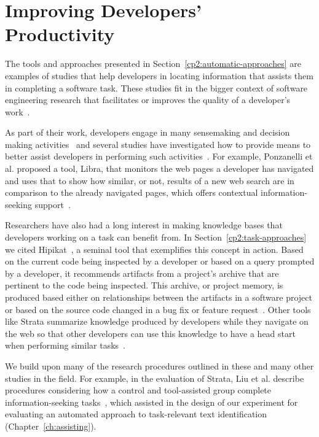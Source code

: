 



\section{Improving Developers' Productivity}
\label{cp2:dev-productivity}



The tools and approaches presented in Section~\ref{cp2:automatic-approaches}
are examples of studies that help developers in locating 
information that assists them in completing a software task.
These studies fit in the bigger context 
of software engineering research 
that facilitates or improves the quality of a developer's work~\cite{Kersten2006, Meyer2017, satterfield2020}. 





As part of their work, developers engage in many sensemaking and decision making activities~\cite{sillito2006} and several studies have investigated how to 
provide means to better  
assist developers in performing such activities~\cite{Liu2018Unakite, liu2021, barnett2015}.
For example, 
Ponzanelli et al. proposed a tool, Libra, that monitors the web pages a developer 
has navigated and uses that to show 
how similar, or not, results of a new web search are in comparison to the already navigated 
pages, which offers contextual information-seeking support~\cite{Ponzanelli2017}.



Researchers have also had a long interest in 
making knowledge bases
that developers working on a task can benefit from. 
In Section~\ref{cp2:task-approaches} 
we cited Hipikat~\cite{Cubranic2005}, a seminal tool that exemplifies this concept in action.
Based on the current code being inspected by a developer or based on a query prompted by a developer, 
it recommends artifacts from a project's archive 
that are pertinent to the code being inspected.
This archive, or project memory, is produced 
based either on relationships between the artifacts in a software project 
or based on the source code changed in a bug fix or feature request~\cite{Cubranic2005}.
Other tools like Strata summarize knowledge produced by developers 
while they navigate on the web so that other developers
can use this knowledge to have a 
 head start when performing similar tasks~\cite{liu2021}.




We build upon many of the research procedures outlined 
in these and many other studies in the field. 
For example, in the evaluation of Strata, 
 Liu et al. describe procedures 
considering how a control and tool-assisted group 
complete information-seeking tasks~\cite{liu2021},
which assisted in the design of our experiment for 
evaluating an automated approach to
task-relevant text identification (Chapter~\ref{ch:assisting}).



